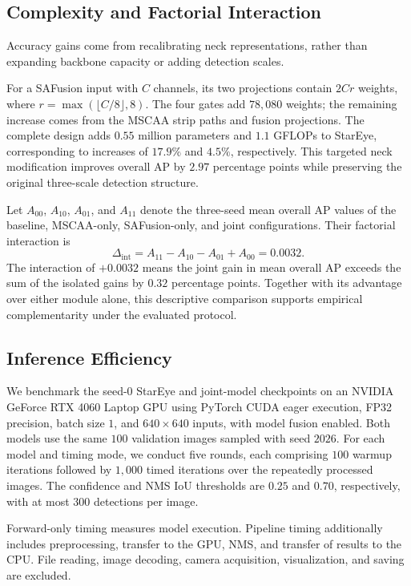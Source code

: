 \documentclass[letterpaper,10pt,conference]{ieeeconf}
\newcommand{\JointInteraction}{\ensuremath{0.0032}}
\begin{document}
\subsection{Complexity and Factorial Interaction}
Accuracy gains come from recalibrating neck representations, rather than expanding backbone capacity or adding detection scales.

For a SAFusion input with \(C\) channels, its two projections contain \(2Cr\)
weights, where \(r=\max(\lfloor C/8\rfloor,8)\). The four gates add \(78{,}080\)
weights; the remaining increase comes from the MSCAA strip paths and fusion
projections. The complete design adds \(0.55\) million parameters and
\(1.1\) GFLOPs to StarEye, corresponding to increases of
\(17.9\%\) and \(4.5\%\), respectively. This targeted neck
modification improves overall AP by \(2.97\) percentage points
while preserving the original three-scale detection structure.

Let \(A_{00}\), \(A_{10}\), \(A_{01}\), and \(A_{11}\) denote the three-seed mean overall AP values of the
baseline, MSCAA-only, SAFusion-only, and joint configurations. Their factorial
interaction is
\begin{equation}
 \Delta_{\mathrm{int}}=A_{11}-A_{10}-A_{01}+A_{00}=\JointInteraction.
 \label{eq:interaction}
\end{equation}
The interaction of \(+0.0032\) means the joint gain in mean overall AP exceeds
the sum of the isolated gains by \(0.32\) percentage points. Together with its
advantage over either module alone, this descriptive comparison supports
empirical complementarity under the evaluated protocol.

\subsection{Inference Efficiency}
We benchmark the seed-0 StarEye and joint-model checkpoints
on an NVIDIA GeForce RTX 4060 Laptop GPU using PyTorch CUDA
eager execution, FP32 precision, batch size \(1\), and
\(640\times640\) inputs, with model fusion enabled.
Both models use the same \(100\) validation images sampled
with seed \(2026\).
For each model and timing mode, we conduct five rounds,
each comprising \(100\) warmup iterations followed by
\(1{,}000\) timed iterations over the repeatedly processed images.
The confidence and NMS IoU thresholds are \(0.25\) and
\(0.70\), respectively, with at most \(300\) detections per image.

Forward-only timing measures model execution.
Pipeline timing additionally includes preprocessing,
transfer to the GPU, NMS, and transfer of results to the CPU.
File reading, image decoding, camera acquisition,
visualization, and saving are excluded.
\end{document}
